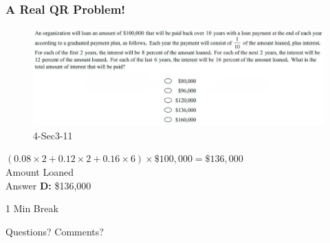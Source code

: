 \documentclass[
	11pt, %
]{beamer}
\begin{document}

\begin{frame}
	\frametitle{A Real QR Problem!}
	\framesubtitle{}
	\begin{figure}
		\includegraphics[width=\linewidth]{Interest_Example_Question2.png}
		\caption{4-Sec3-11}
	\end{figure}
	\pause
	$(0.08 \times 2 + 0.12 \times 2 + 0.16 \times 6) \times \$100,000= \$136,000$\\
\alert{Amount Loaned}\\
	\bigskip
	Answer \textbf{D: } \$136,000
\end{frame}



\begin{frame}[plain] %
	\begin{center}
		{\Huge 1 Min Break}
		\bigskip\bigskip %
		
		{\LARGE Questions? Comments?}
	\end{center}
\end{frame}

\end{document}
